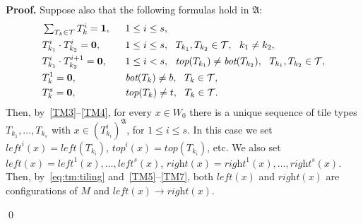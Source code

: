 \documentclass{LMCS}
\renewenvironment{proof}{\par\noindent\textbf{Proof.}}{\mbox{}\qed\par\medskip}
\theoremstyle{plain}
\begin{document}
\begin{proof}
Suppose also that the following formulas hold in $\mathfrak{A}$:
\begin{align}
\label{TM3}
& \textstyle\sum_{T_k\in \mathcal{T}} T_k^i = \one, &&1 \leq  i \leq s,\\
\label{TM4}
& T_{k_1}^i \cdot T_{k_2}^i = \zero, &&1 \leq  i \leq s, \ \ T_{k_1},T_{k_2}\in \mathcal{T}, \ \ k_1 \ne k_2,\\
\label{TM5} &T_{k_1}^i \cdot T_{k_2}^{i+1} = \zero, \quad
&&1 \leq  i < s, \ \ \textit{top}(T_{k_1}) \ne \textit{bot}(T_{k_2}),\ \ T_{k_1},T_{k_2}\in \mathcal{T},\\
\label{TM6}
&T_k^1 = \zero,&&\textit{bot}(T_k) \ne b,\  \ T_k\in \mathcal{T},\\
\label{TM7}
&T_k^s = \zero, &&\textit{top}(T_k) \ne t,\ \ T_k\in \mathcal{T}.\end{align}
Then, by~\eqref{TM3}--\eqref{TM4}, for every $x\in W_0$ there is a unique sequence of tile types $T_{k_1}, \dots, T_{k_s}$ with $x
\in (T^i_{k_i})^{\mathfrak{A}}$, for $1 \leq i \leq s$. In this
case we set $\textit{left}^i(x) =
\textit{left}(T_{k_i})$, $\textit{top}^i(x)
=\textit{top}(T_{k_i})$, etc. We also set $\textit{left}(x) = \textit{left}^1(x), \dots,
\textit{left}^s(x)$,
$\textit{right}(x)=\textit{right}^1(x),\dots,\textit{right}^s(x)$.
Then, by~\eqref{eq:tm:tiling} and~\eqref{TM5}--\eqref{TM7}, both $\textit{left}(x)$ and
$\textit{right}(x)$ are configurations of $M$ and $\textit{left}(x)
\to \textit{right}(x)$.


\end{proof}
\end{document}
